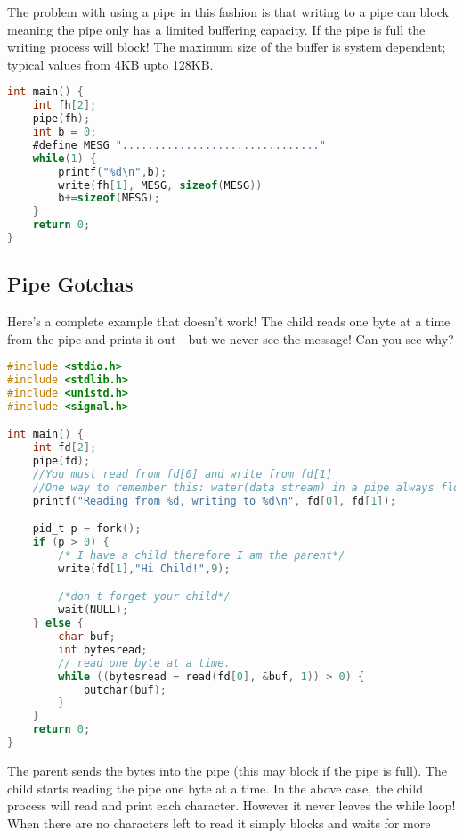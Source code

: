The problem with using a pipe in this fashion is that writing to a pipe can block meaning the pipe only has a limited buffering capacity. If the pipe is full the writing process will block! The maximum size of the buffer is system dependent; typical values from 4KB upto 128KB.

\begin{lstlisting}[language=C]
int main() {
    int fh[2];
    pipe(fh);
    int b = 0;
    #define MESG "..............................."
    while(1) {
        printf("%d\n",b);
        write(fh[1], MESG, sizeof(MESG))
        b+=sizeof(MESG);
    }
    return 0;
}
\end{lstlisting}

\subsection{Pipe Gotchas}\label{pipe-gotchas}

Here's a complete example that doesn't work! The child reads one byte at a time from the pipe and prints it out - but we never see the message! Can you see why?

\begin{lstlisting}[language=C]
#include <stdio.h>
#include <stdlib.h>
#include <unistd.h>
#include <signal.h>

int main() {
    int fd[2];
    pipe(fd);
    //You must read from fd[0] and write from fd[1]
    //One way to remember this: water(data stream) in a pipe always flows from a higher place(1) to a lower place(0)
    printf("Reading from %d, writing to %d\n", fd[0], fd[1]);

    pid_t p = fork();
    if (p > 0) {
        /* I have a child therefore I am the parent*/
        write(fd[1],"Hi Child!",9);

        /*don't forget your child*/
        wait(NULL);
    } else {
        char buf;
        int bytesread;
        // read one byte at a time.
        while ((bytesread = read(fd[0], &buf, 1)) > 0) {
            putchar(buf);
        }
    }
    return 0;
}
\end{lstlisting}

The parent sends the bytes  into the pipe (this may block if the pipe is full). The child starts reading the pipe one byte at a time. In the above case, the child process will read and print each character. However it never leaves the while loop! When there are no characters left to read it simply blocks and waits for more 

